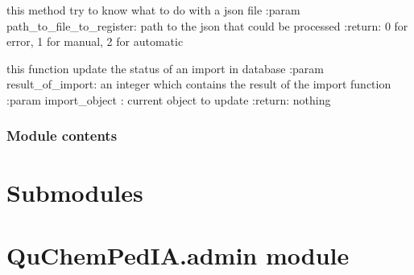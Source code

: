 \documentclass[letterpaper,10pt,english]{sphinxmanual}
\begin{document}

\begin{fulllineitems}
\label{\detokenize{QuChemPedIA.views:QuChemPedIA.views.importView.register_soft_and_version}}
this method try to know what to do with a json file
:param path\_to\_file\_to\_register: path to the json that could be processed
:return: 0 for error, 1 for manual, 2 for automatic

\end{fulllineitems}


\begin{fulllineitems}
\label{\detokenize{QuChemPedIA.views:QuChemPedIA.views.importView.update_status_in_db}}
this function update the status of an import in database
:param result\_of\_import: an integer which contains the result of the import function
:param import\_object : current object to update
:return: nothing

\end{fulllineitems}



\subsection{Module contents}
\label{\detokenize{QuChemPedIA.views:module-QuChemPedIA.views}}\label{\detokenize{QuChemPedIA.views:module-contents}}

\chapter{Submodules}
\label{\detokenize{QuChemPedIA:submodules}}

\chapter{QuChemPedIA.admin module}
\label{\detokenize{QuChemPedIA:module-QuChemPedIA.admin}}\label{\detokenize{QuChemPedIA:quchempedia-admin-module}}
\end{document}
